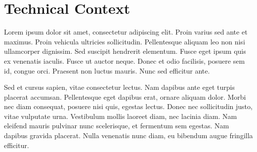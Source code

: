 \chapter{Technical Context}
 Lorem ipsum dolor sit amet, consectetur adipiscing elit. Proin varius sed ante et maximus. Proin vehicula ultricies sollicitudin. Pellentesque aliquam leo non nisi ullamcorper dignissim. Sed suscipit hendrerit elementum. Fusce eget ipsum quis ex venenatis iaculis. Fusce ut auctor neque. Donec et odio facilisis, posuere sem id, congue orci. Praesent non luctus mauris. Nunc sed efficitur ante.

Sed et cursus sapien, vitae consectetur lectus. Nam dapibus ante eget turpis placerat accumsan. Pellentesque eget dapibus erat, ornare aliquam dolor. Morbi nec diam consequat, posuere nisi quis, egestas lectus. Donec nec sollicitudin justo, vitae vulputate urna. Vestibulum mollis laoreet diam, nec lacinia diam. Nam eleifend mauris pulvinar nunc scelerisque, et fermentum sem egestas. Nam dapibus gravida placerat. Nulla venenatis nunc diam, eu bibendum augue fringilla efficitur.
